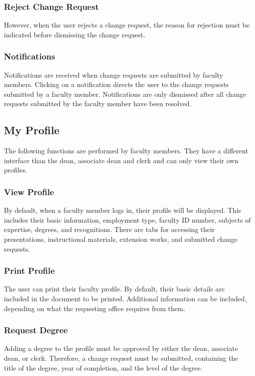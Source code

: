     	\subsubsection{Reject Change Request}
    	However, when the user rejects a change request, the reason for rejection must be indicated before dismissing the change request.
    	
    	\subsubsection{Notifications}
    	Notifications are received when change requests are submitted by faculty members. Clicking on a notification directs the user to the change requests submitted by a faculty member. Notifications are only dismissed after all change requests submitted by the faculty member have been resolved.
        
    \subsection{My Profile}
    The following functions are performed by faculty members. They have a different interface than the dean, associate dean and clerk and can only view their own profiles.
        
        \subsubsection{View Profile}
        By default, when a faculty member logs in, their profile will be displayed. This includes their basic information, employment type, faculty ID number, subjects of expertise, degrees, and recognitions. There are tabs for accessing their presentations, instructional materials, extension works, and submitted change requests.
        
        \subsubsection{Print Profile}
        The user can print their faculty profile. By default, their basic details are included in the document to be printed. Additional information can be included, depending on what the requesting office requires from them.
        
        \subsubsection{Request Degree}
        Adding a degree to the profile must be approved by either the dean, associate dean, or clerk. Therefore, a change request must be submitted, containing the title of the degree, year of completion, and the level of the degree.
        
